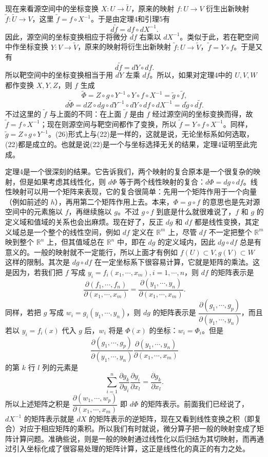现在来看源空间中的坐标变换 $X:U\to\widetilde U$，原来的映射 $f:U\to V$ 衍生出新映射 $\widetilde f:\widetilde U\to V$，这里 $\widetilde f=f\circ X^{-1}$。于是由定理4和引理5有
\[
 d\widetilde f=df\circ dX^{-1}.
\]
因此，源空间的坐标变换相应于将微分 $df$ 右乘以 $dX^{-1}$。类似于此，若在靶空间中作坐标变换 $Y:V\to\widetilde V$，原来的映射将衍生出新映射 $\widetilde f:U\to\widetilde V$，$\widetilde f=Y\circ f$。于是又有
\[
 d\widetilde f=dY\circ df.
\]
所以靶空间中的坐标变换相当于用 $dY$ 左乘 $df$。所以，如果对定理4中的 $U,V,W$ 都作变换 $X,Y,Z$，则 $f$ 生成
\[
 \widetilde\Phi=Z\circ g\circ Y^{-1}\circ Y\circ f\circ X^{-1}=\widetilde g\circ\widetilde f,
\]
\begin{equation}
 d\widetilde\Phi=dZ\circ dg\circ dY^{-1}\circ dY\circ df\circ dX^{-1}=d\widetilde g\circ d\widetilde f.
 \tag{26}
\end{equation}
不过这里的 $\widetilde f$ 与上面的不同：在上面 $\widetilde f$ 是由 $f$ 经过源空间的坐标变换而得，故 $\widetilde f=f\circ X^{-1}$；现在则源空间与靶空间都作了变换，所以 $\widetilde f=Y\circ f\circ X^{-1}$。同样，$\widetilde g=Z\circ g\circ Y^{-1}$。(26)形式上与(22)是一样的，这就是说，无论坐标系如何选取，(22)都是成立的。也就是说(22)是一个与坐标选择无关的结果，定理4证明至此完成。

定理4是一个很深刻的结果。它告诉我们，两个映射的复合原本是一个很复杂的映射，但是如果考虑其线性化，则 $d\Phi$ 等于两个线性映射的复合：$d\Phi=dg\circ df$。线性映射可以用一个矩阵来表现，它的复合很简单：先用一个矩阵作用于一个向量（例如前述的 $h$），再用第二个矩阵作用上去。本来，$\Phi=g\circ f$ 的意思也是先对源空间中的元素施以 $f$，再继续施以 $g$。不过 $g\circ f$ 到底是什么就很难说了，$f$ 和 $g$ 的定义域和值域的关系也会出麻烦。现在好了，反正 $dg$ 和 $df$ 都是线性变换，其定义域总是一个整个的线性空间，例如 $df$ 定义在 $\mathbb R^m$ 上，尽管 $df$ 不一定把整个 $\mathbb R^m$ 映到整个 $\mathbb R^n$ 上，但其值域总在 $\mathbb R^n$ 中，即在 $dg$ 的定义域内，因此 $dg\circ df$ 总是有意义的。一般的映射就不一定能行，所以上面才有例如 $f(U)\subset V,g(V)\subset W$ 这样的限制。其次是 $dg\circ df$ 在一定坐标系下很容易计算，它就是矩阵的乘法。这是因为，若我们把 $f$ 写成 $y_i=f_i(x_1,\cdots,x_m),i=1,\cdots,n$，则 $df$ 的矩阵表示是
\[
 \frac{\partial(f_1,\cdots,f_n)}{\partial(x_1,\cdots,x_m)}=
 \frac{\partial(y_1,\cdots,y_n)}{\partial(x_1,\cdots,x_m)}.
\]
同样，若把 $g$ 写成 $w_i=g_i(y_1,\cdots,y_n)$，则 $dg$ 的矩阵表示是 $\dfrac{\partial(g_1,\cdots,g_p)}{\partial(y_1,\cdots,y_n)}$，而且若以 $y_i=f_i(x)$ 代入 $g$ 后，$w_i$ 将是 $\Phi(x)$ 的坐标：$w_i=\Phi_i$。但是
\[
 \frac{\partial(g_1,\cdots,g_p)}{\partial(y_1,\cdots,y_n)}
 \frac{\partial(y_1,\cdots,y_n)}{\partial(x_1,\cdots,x_m)}
\]
的第 $k$ 行 $l$ 列的元素是
\[
 \sum_{i=1}^n\frac{\partial g_k}{\partial y_i}\frac{\partial y_i}{\partial x_l}
 =\frac{\partial g_k}{\partial x_l}.
\]
所以上述矩阵之积是 $\dfrac{\partial(w_1,\cdots,w_p)}{\partial(x_1,\cdots,x_m)}$ 即 $d\Phi$ 的矩阵表示。前面我们已经说了，$dX^{-1}$ 的矩阵表示就是 $dX$ 的矩阵表示的逆矩阵，现在又看到线性变换之积（即复合）对应于相应矩阵的乘积。所以我们有时就说，微分算子把一般的映射变成了矩阵计算问题。准确些说，则是一般的映射通过线性化以后归结为其切映射，而再通过引入坐标化成了很容易处理的矩阵计算，这正是线性化的真正的有力之处。

